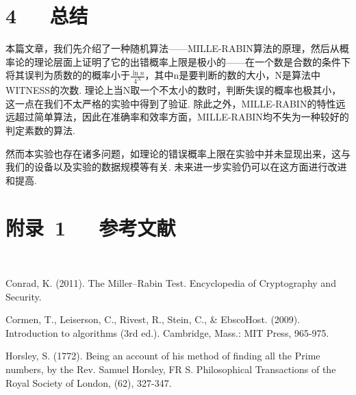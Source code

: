 \documentclass[UTF8]{ctexart}
\begin{document}
\section*{4\ \ \ 总结}
本篇文章，我们先介绍了一种随机算法——MILLE-RABIN算法的原理，然后从概率论的理论层面上证明了它的出错概率上限是极小的——在一个数是合数的条件下将其误判为质数的的概率小于$\frac{\ln n}{4^N}$，其中n是要判断的数的大小，N是算法中WITNESS的次数. 理论上当N取一个不太小的数时，判断失误的概率也极其小，这一点在我们不太严格的实验中得到了验证. 除此之外，MILLE-RABIN的特性远远超过简单算法，因此在准确率和效率方面，MILLE-RABIN均不失为一种较好的判定素数的算法.\par
然而本实验也存在诸多问题，如理论的错误概率上限在实验中并未显现出来，这与我们的设备以及实验的数据规模等有关. 未来进一步实验仍可以在这方面进行改进和提高.\vspace{20em}
\section*{附录\ 1\ \ \ 参考文献}\ \par
[1] Conrad, K. (2011). The Miller–Rabin Test. Encyclopedia of Cryptography and Security.\\\par
[2] Cormen, T., Leiserson, C., Rivest, R., Stein, C., \& EbscoHost. (2009). Introduction to algorithms (3rd ed.). Cambridge, Mass.: MIT Press, 965-975.\\\par
[3] Horsley, S. (1772). Being an account of his method of finding all the Prime numbers, by the Rev. Samuel Horsley, FR S. Philosophical Transactions of the Royal Society of London, (62), 327-347.
\vspace{5em}
\end{document}
